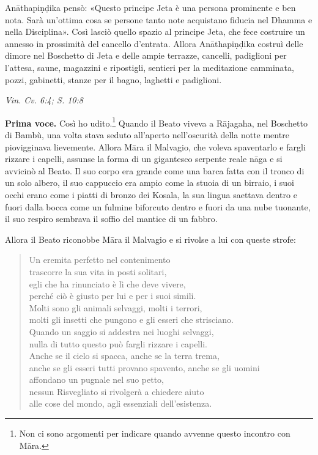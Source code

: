 Anāthapiṇḍika pensò: «Questo principe Jeta è una persona prominente e
ben nota. Sarà un’ottima cosa se persone tanto note acquistano fiducia
nel Dhamma e nella Disciplina». Così lasciò quello spazio al principe
Jeta, che fece costruire un annesso in prossimità del cancello
d’entrata. Allora Anāthapiṇḍika costruì delle dimore nel Boschetto di
Jeta e delle ampie terrazze, cancelli, padiglioni per l’attesa, saune,
magazzini e ripostigli, sentieri per la meditazione camminata, pozzi,
gabinetti, stanze per il bagno, laghetti e padiglioni.


\emph{Vin. Cv. 6:4; S. 10:8}


\textbf{Prima voce.} Così ho udito.\footnote{Non ci sono argomenti per indicare quando avvenne questo incontro con Māra.} Quando il Beato viveva a
Rājagaha, nel Boschetto di Bambù, una volta stava seduto all’aperto
nell’oscurità della notte mentre piovigginava lievemente. Allora Māra il
Malvagio, che voleva spaventarlo e fargli rizzare i capelli, assunse la
forma di un gigantesco serpente reale nāga e si avvicinò al Beato. Il
suo corpo era grande come una barca fatta con il tronco di un solo
albero, il suo cappuccio era ampio come la stuoia di un birraio, i suoi
occhi erano come i piatti di bronzo dei Kosala, la sua lingua saettava
dentro e fuori dalla bocca come un fulmine biforcuto dentro e fuori da
una nube tuonante, il suo respiro sembrava il soffio del mantice di un
fabbro.


Allora il Beato riconobbe Māra il Malvagio e si rivolse a lui con queste
strofe:


\begin{quotation}
Un eremita perfetto nel contenimento \\
trascorre la sua vita in posti solitari, \\
egli che ha rinunciato è lì che deve vivere, \\
perché ciò è giusto per lui e per i suoi simili. \\
Molti sono gli animali selvaggi, molti i terrori, \\
molti gli insetti che pungono e gli esseri che strisciano. \\
Quando un saggio si addestra nei luoghi selvaggi, \\
nulla di tutto questo può fargli rizzare i capelli. \\
Anche se il cielo si spacca, anche se la terra trema, \\
anche se gli esseri tutti provano spavento, anche se gli uomini \\
affondano un pugnale nel suo petto, \\
nessun Risvegliato si rivolgerà a chiedere aiuto \\
alle cose del mondo, agli essenziali dell’esistenza.
\end{quotation}

